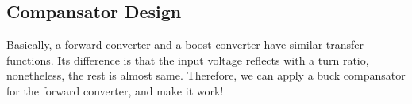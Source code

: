 \subsection{Compansator Design}

Basically, a forward converter and a boost converter have similar transfer functions. Its difference is that the input voltage reflects with a turn ratio, nonetheless, the rest is almost same. Therefore, we can apply a buck compansator for the forward converter, and make it work!

















